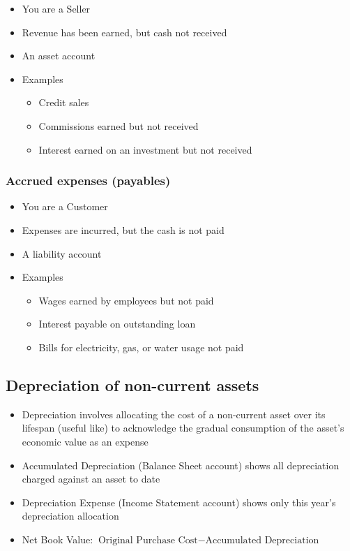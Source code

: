 \documentclass{article}
\begin{document}
			\begin{itemize}
				\item You are a Seller
				\item Revenue has been earned, but cash not received
				\item \colorbox{pastel_green}{An asset account}
				\item Examples
					\begin{itemize}
						\item Credit sales
						\item Commissions earned but not received
						\item Interest earned on an investment but not received
					\end{itemize}
			\end{itemize}

		\subsubsection{Accrued expenses (payables)}

			\begin{itemize}
				\item You are a Customer
				\item Expenses are incurred, but the cash is not paid
				\item \colorbox{pastel_red}{A liability account}
				\item Examples
					\begin{itemize}
						\item Wages earned by employees but not paid
						\item Interest payable on outstanding loan
						\item Bills for electricity, gas, or water usage not paid
					\end{itemize}
			\end{itemize}

	\subsection{Depreciation of non-current assets}
		
		\begin{itemize}
			\item Depreciation involves allocating the cost of a non-current asset over its lifespan (useful like) to acknowledge the gradual consumption of the asset's economic value as an expense
			\item Accumulated Depreciation (Balance Sheet account) shows all depreciation charged against an asset to date
			\item Depreciation Expense (Income Statement account) shows only this year's depreciation allocation
			\item Net Book Value: $\text{Original Purchase Cost} - \text{Accumulated Depreciation}$
		\end{itemize}
\end{document}
